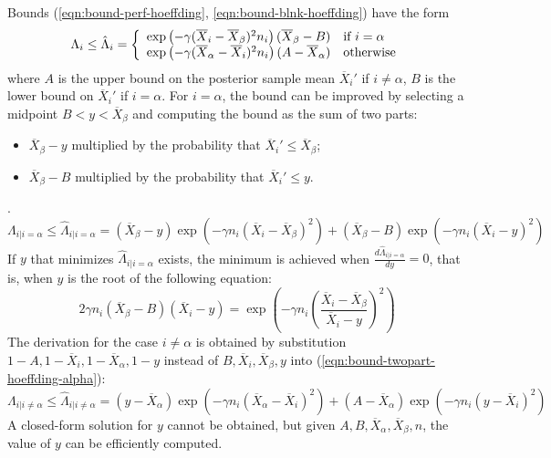 \documentclass{article}
\begin{document}
Bounds (\ref{eqn:bound-perf-hoeffding}, \ref{eqn:bound-blnk-hoeffding}) have the form
\begin{equation}
  \Lambda_i \le \hat\Lambda_i=\left\{
  \begin{array}{l l}
    \exp\left(- \gamma(\overline X_i - \overline X_\beta)^2 n_i \right)(\overline X_\beta-B) & \mbox{if $i=\alpha$} \\
    \exp\left(- \gamma(\overline X_\alpha - \overline X_i)^2 n_i \right)(A-\overline  X_\alpha)  &  \mbox{otherwise}
  \end{array} \right.
\label{eqn:bound-generic-hoeffding}
\end{equation}
where $A$ is the upper bound on the posterior sample mean $\overline X_i'$ if $i\ne \alpha$, $B$ is the lower bound on $\overline X_i'$ if $i=\alpha$. For $i=\alpha$, the bound can be improved by selecting a midpoint
$B < y < \overline X_\beta$ and computing the bound as the sum of two parts:
\begin{itemize}
\item $\overline X_\beta-y$ multiplied by the probability that
  $\overline X_i' \le \overline X_\beta$;
\item $\overline X_\beta-B$ multiplied by the probability that $\overline X_i'\le
  y$.
\end{itemize}.
\begin{equation}
\Lambda_{i|i=\alpha} \le \hat \Lambda_{i|i=\alpha} =
 (\overline X_\beta-y)\exp\left(-\gamma n_i(\overline X_i-\overline X_\beta)^2\right)
 +(\overline X_\beta-B)\exp\left(-\gamma n_i(\overline X_i-y)^2\right)
\label{eqn:bound-twopart-hoeffding-alpha}
\end{equation}
If $y$ that minimizes $\hat\Lambda_{i|i=\alpha}$ exists, the minimum is achieved when
 $\frac {d\hat\Lambda_{i|i=\alpha}} {dy}=0$, that
is, when $y$ is the root of the following equation:
\begin{equation}
2\gamma n_i(\overline X_\beta-B)(\overline X_i-y)=\exp\left(-\gamma n_i\left(\frac {\overline X_i-\overline X_\beta}
    {\overline X_i-y}\right)^2\right)
\end{equation}
The derivation for the case $i\ne \alpha$ is obtained by substitution $1-A, 1-\overline X_i, 1-\overline X_\alpha, 1-y$ instead of
$B, \overline X_i, \overline X_\beta, y$ into (\ref{eqn:bound-twopart-hoeffding-alpha}):
\begin{equation}
\Lambda_{i|i\ne\alpha} \le \hat\Lambda_{i|i\ne\alpha} = (y-\overline X_\alpha)\exp\left(-\gamma n_i(\overline X_\alpha-\overline
  X_i)^2\right)+(A-\overline X_\alpha)\exp\left(-\gamma n_i(y-\overline X_i)^2\right)
\label{eqn:bound-twopart-hoeffding-rest}
\end{equation}
A closed-form solution for $y$ cannot be obtained, but given
$A, B, \overline X_\alpha, \overline X_\beta, n$, the value of $y$ can be efficiently
computed.



\end{document}
